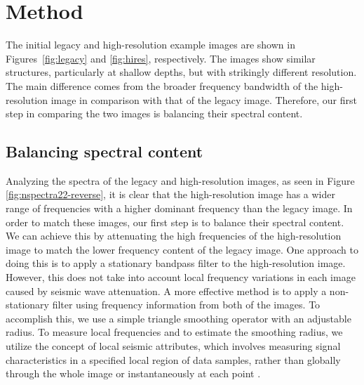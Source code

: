 
\section{Method}

The initial legacy and high-resolution example images are shown in Figures~\ref{fig:legacy}
and \ref{fig:hires}, respectively. The images show similar structures, particularly at shallow depths, but with
strikingly different resolution. The main difference comes from the
broader frequency bandwidth of the high-resolution image in comparison
with that of the legacy image. Therefore, our first step in comparing
the two images is balancing their spectral content.

\subsection{Balancing spectral content}

Analyzing the spectra of the legacy and high-resolution images, as
seen in Figure \ref{fig:nspectra22-reverse}, it is clear that the
high-resolution image has a wider range of frequencies with a higher
dominant frequency than the legacy image. In order to match these
images, our first step is to balance their spectral content. We can achieve 
this by attenuating the high frequencies of the high-resolution image
to match the lower frequency content of the legacy image. One approach
to doing this is to apply a stationary bandpass filter to the
high-resolution image. However, this does not take into account
local frequency variations in each image caused by seismic wave attenuation.
A more effective method is to apply a non-stationary filter using
frequency information from both of the images. To accomplish this, we use a
simple triangle smoothing operator with an adjustable radius. 
To measure local frequencies and to estimate the smoothing radius, we
utilize the concept of local seismic attributes, which
involves measuring signal characteristics in a specified local region of data
samples, rather than globally through the whole image or
instantaneously at each point \cite[]{attr}.


